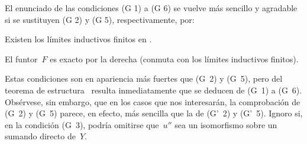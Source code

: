 \begin{remarques}
\label{V.4.2}
El enunciado de las condiciones (G 1) a (G 6) se vuelve más sencillo y
agradable si se sustituyen (G 2) y (G 5), respectivamente, por:
\begin{enumerateb}
\item[(G' 2)] Existen los límites inductivos finitos en
.%
\item[(G' 5)] El funtor~$F$ es exacto por la derecha (\ie conmuta con los
límites inductivos finitos).
\end{enumerateb}
Estas condiciones son en apariencia más fuertes que (G~2) y (G~5), pero del
teorema de estructura~ resulta inmediatamente que se deducen de
(G~1) a (G~6). Obsérvese, sin embargo, que en los casos que nos interesarán,
la comprobación de (G~2) y (G~5) parece, en efecto, más sencilla que la de
(G'~2) y (G'~5). Ignoro si, en la condición (G~3), podría omitirse que~$u''$
sea un isomorfismo sobre un sumando directo de~$Y$.
\end{remarques}
